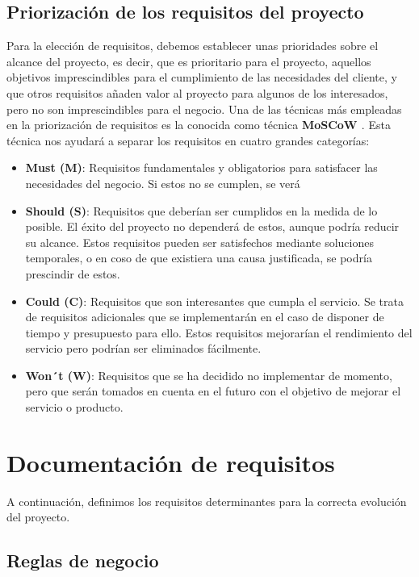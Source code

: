 \subsection{Priorización de los requisitos del proyecto}
Para la elección de requisitos, debemos establecer unas prioridades sobre el alcance del proyecto, es decir, que es prioritario para el proyecto, aquellos objetivos imprescindibles para el cumplimiento de las necesidades del cliente, y que otros requisitos añaden valor al proyecto para algunos de los interesados, pero no son imprescindibles para el negocio. Una de las técnicas más empleadas en la priorización de requisitos es la conocida como técnica \textbf{MoSCoW \cite{moscow}}. Esta técnica nos ayudará a separar los requisitos en cuatro grandes categorías:

\begin{itemize}

\item \textbf{Must (M)}: Requisitos fundamentales y obligatorios para satisfacer las necesidades del negocio. Si estos no se cumplen, se verá 
\item \textbf{Should (S)}: Requisitos que deberían ser cumplidos en la medida de lo posible. El éxito del proyecto no dependerá de estos, aunque podría reducir su alcance. Estos requisitos pueden ser satisfechos mediante soluciones temporales, o en coso de que existiera una causa justificada, se podría prescindir de estos.
\item \textbf{Could (C)}: Requisitos que son interesantes que cumpla el servicio. Se trata de requisitos adicionales que se implementarán en el caso de disponer de tiempo y presupuesto para ello. Estos requisitos mejorarían el rendimiento del servicio pero podrían ser eliminados fácilmente.
\item \textbf{Won´t (W)}: Requisitos que se ha decidido no implementar de momento, pero que serán tomados en cuenta en el futuro con el objetivo de mejorar el servicio o producto. 

\end{itemize}

\section{Documentación de requisitos}
A continuación, definimos los requisitos determinantes para la correcta evolución del proyecto.

\subsection{Reglas de negocio}

